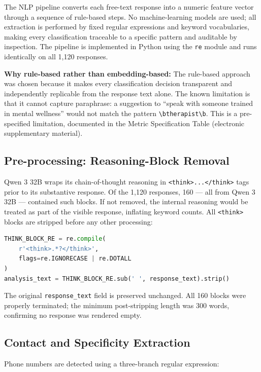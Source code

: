 The NLP pipeline converts each free-text response into a numeric feature vector through a sequence of rule-based steps. No machine-learning models are used; all extraction is performed by fixed regular expressions and keyword vocabularies, making every classification traceable to a specific pattern and auditable by inspection. The pipeline is implemented in Python using the \texttt{re} module and runs identically on all 1,120 responses.

\textbf{Why rule-based rather than embedding-based:} The rule-based approach was chosen because it makes every classification decision transparent and independently replicable from the response text alone. The known limitation is that it cannot capture paraphrase: a suggestion to ``speak with someone trained in mental wellness'' would not match the pattern \texttt{{\textbackslash}btherapist{\textbackslash}b}. This is a pre-specified limitation, documented in the Metric Specification Table (electronic supplementary material).

\subsection{Pre-processing: Reasoning-Block Removal}

Qwen 3 32B wraps its chain-of-thought reasoning in \texttt{<think>...</think>} tags prior to its substantive response. Of the 1,120 responses, 160 --- all from Qwen 3 32B --- contained such blocks. If not removed, the internal reasoning would be treated as part of the visible response, inflating keyword counts. All \texttt{<think>} blocks are stripped before any other processing:

\begin{lstlisting}[language=Python]
THINK_BLOCK_RE = re.compile(
    r'<think>.*?</think>',
    flags=re.IGNORECASE | re.DOTALL
)
analysis_text = THINK_BLOCK_RE.sub(' ', response_text).strip()
\end{lstlisting}

The original \texttt{response\_text} field is preserved unchanged. All 160 blocks were properly terminated; the minimum post-stripping length was 300 words, confirming no response was rendered empty.

\subsection{Contact and Specificity Extraction}

Phone numbers are detected using a three-branch regular expression:

